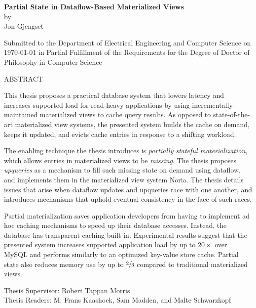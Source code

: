 \documentclass[fontsize=12pt,paper=letter]{scrartcl}
\begin{document}
\begin{titlepage}
  \begin{center}
    \textbf{\large Partial State in Dataflow-Based Materialized Views}\\
    \vspace{0.5\baselineskip}
    by\\
    \vspace{0.5\baselineskip}
    {\large Jon Gjengset}\\
    \vspace{0.5\baselineskip}
    \begin{addmargin}[0.15in]{0.15in}
      \centering
    Submitted to the Department of
    Electrical Engineering and Computer Science
    on \today{}
    in Partial Fulfillment of the Requirements for the Degree of
    Doctor of Philosophy in Computer Science
    \end{addmargin}
  \end{center}

  \begin{flushleft}
  ABSTRACT
  \vspace{0.5\baselineskip}

  This thesis proposes a practical database system that lowers latency and
    increases supported load for read-heavy applications by using
    incrementally-maintained materialized views to cache query results. As
    opposed to state-of-the-art materialized view systems, the presented system
    builds the cache on demand, keeps it updated, and evicts cache entries in
    response to a shifting workload.

  \vspace{0.5\baselineskip}

  The enabling technique the thesis introduces is \textit{partially stateful
    materialization}, which allows entries in materialized views to be
    \textit{missing}. The thesis proposes \textit{upqueries} as a mechanism to
    fill such missing state on demand using dataflow, and implements them in the
    materialized view system Noria. The thesis details issues that arise when
    dataflow updates and upqueries race with one another, and introduces
    mechanisms that uphold eventual consistency in the face of such races.

  \vspace{0.5\baselineskip}

  Partial materialization saves application developers from having to implement
    ad hoc caching mechanisms to speed up their database accesses. Instead, the
    database has transparent caching built in. Experimental results suggest that
    the presented system increases supported application load by up to
    $20\times$ over MySQL and performs similarly to an optimized key-value store
    cache. Partial state also reduces memory use by up to $\sfrac{2}{3}$
    compared to traditional materialized views.

  \vspace{\baselineskip}
  Thesis Supervisor: Robert Tappan Morris\\
  Thesis Readers: M. Frans Kaashoek, Sam Madden, and Malte Schwarzkopf
  \end{flushleft}
\end{titlepage}
\end{document}
